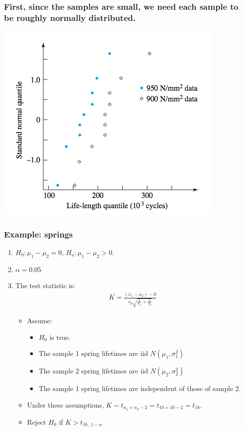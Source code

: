 \documentclass[handout]{beamer}\usepackage{graphicx, color}
\providecommand{\ov}[1]{\overline{#1}}
\numberwithin{equation}{section}
\begin{document}
\begin{frame}
\frametitle{\small First, since the samples are small, we need each sample to be roughly normally distributed.}
 \includegraphics{../../fig/springsqq.png}
\end{frame}
















\begin{frame}
\frametitle{Example: springs}
\begin{enumerate}[1. ]
\item $H_0:  \mu_1 - \mu_2 = 0$, $H_a: \mu_1 - \mu_2 > 0$.
\pause \item $\alpha = 0.05$
\pause \item The test statistic is:
\pause \begin{align*}
K = \frac{(\ov{x}_1 - \ov{x}_2) - 0}{s_p \sqrt{\frac{1}{n_1} + \frac{1}{n_2}}}
\end{align*}
\begin{itemize}
\pause \item Assume:
\begin{itemize}
\pause \item $H_0$ is true.
\pause \item The sample 1 spring lifetimes are iid $N(\mu_1, \sigma^2_1)$
\pause \item The sample 2 spring lifetimes are iid $N(\mu_2, \sigma^2_2)$
\pause \item The sample 1 spring lifetimes are independent of those of sample 2.
\end{itemize}
\pause \item Under these assumptions, $K \sim t_{n_1 + n_2 - 2} = t_{10 + 10 - 2} = t_{18}$.
\pause \item Reject $H_0$ if $K > t_{18, \ 1 - \alpha}$
\end{itemize}
\setcounter{saveenum}{\value{enumi}}

\end{enumerate}
\end{frame}
\end{document}
